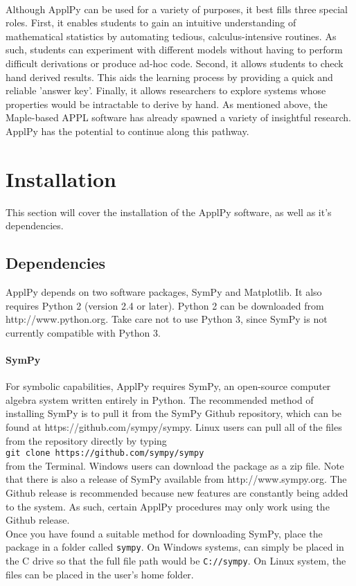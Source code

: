 \documentclass[11pt,epsfig,psfig,doublespace,singlespace]{article}
\begin{document}
\paragraph{} Although ApplPy can be used for a variety of purposes, it best fills three special roles. First, it enables students to gain an intuitive understanding of mathematical statistics by automating tedious, calculus-intensive routines. As such, students can experiment with different models without having to perform difficult derivations or produce ad-hoc code. Second, it allows students to check hand derived results. This aids the learning process by providing a quick and reliable 'answer key'. Finally, it allows researchers to explore systems whose properties would be intractable to derive by hand. As mentioned above, the Maple-based APPL software has already spawned a variety of insightful research. ApplPy has the potential to continue along this pathway.
\section{Installation}
This section will cover the installation of the ApplPy software, as well as it's dependencies.
\subsection{Dependencies}
ApplPy depends on two software packages, SymPy and Matplotlib. It also requires Python 2 (version 2.4 or later). Python 2 can be downloaded from http://www.python.org. Take care not to use Python 3, since SymPy is not currently compatible with Python 3.
\paragraph{SymPy} For symbolic capabilities, ApplPy requires SymPy, an open-source computer algebra system written entirely in Python. The recommended method of installing SymPy is to pull it from the SymPy Github repository, which can be found at https://github.com/sympy/sympy. Linux users can pull all of the files from the repository directly by typing 
\\
 \texttt{git clone https://github.com/sympy/sympy} 
 \\
from the Terminal. Windows users can download the package as a zip file. Note that there is also a release of SymPy available from http://www.sympy.org. The Github release is recommended because new features are constantly being added to the system. As such, certain ApplPy procedures may only work using the Github release. \\
Once you have found a suitable method for downloading SymPy, place the package in a folder called \texttt{sympy}. On Windows systems, can simply be placed in the C drive so that the full file path would be \texttt{C://sympy}. On Linux system, the files can be placed in the user's home folder.
\end{document}
